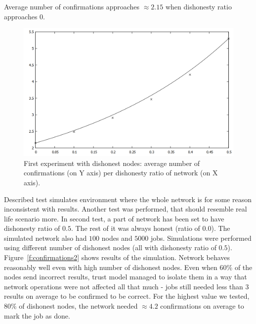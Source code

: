 Average number of confirmations approaches $\approx 2.15$ when dishonesty ratio approaches $0$.

\begin{figure}
\centering
\includegraphics[width=\textwidth]{diagrams/confirmations.png}
\caption{First experiment with dishonest nodes: average number of confirmations (on Y axis) per dishonesty ratio of network (on X axis).}
\label{f:confirmations1}
\end{figure}

Described test simulates environment where the whole network is for some reason inconsistent with results. Another test was performed, that should resemble real life scenario more. In second test, a part of network has been set to have dishonesty ratio of $0.5$. The rest of it was always honest (ratio of $0.0$). The simulated network also had $100$ nodes and $5000$ jobs. Simulations were performed using different number of dishonest nodes (all with dishonesty ratio of $0.5$). Figure~\ref{f:confirmations2} shows results of the simulation. Network behaves reasonably well even with high number of dishonest nodes. Even when $60\%$ of the nodes send incorrect results, trust model managed to isolate them in a way that network operations were not affected all that much - jobs still needed less than 3 results on average to be confirmed to be correct. For the highest value we tested, $80\%$ of dishonest nodes, the network needed $\approx 4.2$ confirmations on average to mark the job as done.

